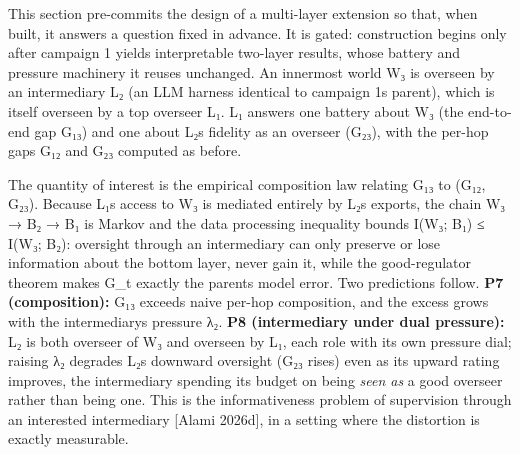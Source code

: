 \documentclass[11pt]{article}
\begin{document}
This section pre-commits the design of a multi-layer extension so that,
when built, it answers a question fixed in advance. It is gated:
construction begins only after campaign 1 yields interpretable two-layer
results, whose battery and pressure machinery it reuses unchanged. An
innermost world W₃ is overseen by an intermediary L₂ (an LLM harness
identical to campaign 1\textquotesingle s parent), which is itself
overseen by a top overseer L₁. L₁ answers one battery about W₃ (the
end-to-end gap G₁₃) and one about L₂\textquotesingle s fidelity as an
overseer (G₂₃), with the per-hop gaps G₁₂ and G₂₃ computed as before.

The quantity of interest is the empirical composition law relating G₁₃
to (G₁₂, G₂₃). Because L₁\textquotesingle s access to W₃ is mediated
entirely by L₂\textquotesingle s exports, the chain W₃ → B₂ → B₁ is
Markov and the data processing inequality bounds I(W₃; B₁) ≤ I(W₃; B₂):
oversight through an intermediary can only preserve or lose information
about the bottom layer, never gain it, while the good-regulator theorem
makes G\_t exactly the parent\textquotesingle s model error. Two
predictions follow. \textbf{P7 (composition):} G₁₃ exceeds naive per-hop
composition, and the excess grows with the
intermediary\textquotesingle s pressure λ₂. \textbf{P8 (intermediary
under dual pressure):} L₂ is both overseer of W₃ and overseen by L₁,
each role with its own pressure dial; raising λ₂ degrades
L₂\textquotesingle s downward oversight (G₂₃ rises) even as its upward
rating improves, the intermediary spending its budget on being
\emph{seen as} a good overseer rather than being one. This is the
informativeness problem of supervision through an interested
intermediary {[}Alami 2026d{]}, in a setting where the distortion is
exactly measurable.
\end{document}
